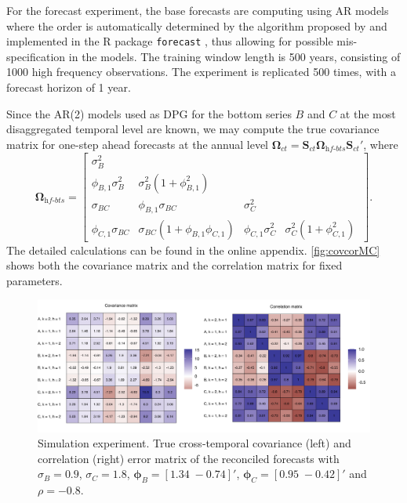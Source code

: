 \documentclass[12pt]{article}
\newcommand{\Svet}{\bm{S}}
\newcommand{\Omegavet}{\bm{\Omega}}
\newcommand{\phivet}{\bm{\phi}}
\theoremstyle{definition}
\begin{document}
For the forecast experiment, the base forecasts are computing using AR models where the order is automatically determined by the algorithm proposed by \cite{hyndman2008a} and implemented in the R package \texttt{forecast} \citep{Rforecast}, thus allowing for possible mis-specification in the models. The training window length is 500 years, consisting of 1000 high frequency observations. The experiment is replicated 500 times, with a forecast horizon of 1 year.

Since the AR(2) models used as DPG for the bottom series $B$ and $C$ at the most disaggregated temporal level are known, we may compute the true covariance matrix for one-step ahead forecasts at the annual level $\Omegavet_{ct} = \Svet_{ct}\Omegavet_{\textit{hf-bts}}\Svet_{ct}'$, where
$$
	\Omegavet_{\textit{hf-bts}} = \begin{bmatrix}
		\sigma^2_B            &                                                 &                      &                                        \\
		\phi_{B,1}\sigma_B^2  & \sigma_B^2\left(1+\phi_{B,1}^2\right)           &                      &                                        \\
		\sigma_{BC}           & \phi_{B,1}\sigma_{BC}                           & \sigma_C^2           &                                        \\
		\phi_{C,1}\sigma_{BC} & \sigma_{BC}\left(1+\phi_{B,1}\phi_{C,1} \right) & \phi_{C,1}\sigma_C^2 & \sigma_C^2\left(1+\phi_{C,1}^2\right)\
	\end{bmatrix}.
$$
The detailed calculations can be found in the online appendix.
\autoref{fig:covcorMC} shows both the covariance matrix and the correlation matrix for fixed parameters.

\begin{figure}[!t]
	\centering
	\includegraphics[width = \linewidth]{fig/simAR/covcor.pdf}
	\caption{Simulation experiment. True cross-temporal covariance (left) and correlation (right) error matrix of the reconciled forecasts with $\sigma_B = 0.9$, $\sigma_C = 1.8$, $\phivet_B = [1.34\; -0.74]'$, $\phivet_C = [0.95\; -0.42]'$ and $\rho = -0.8$.}
	\label{fig:covcorMC}
\end{figure}
\end{document}
